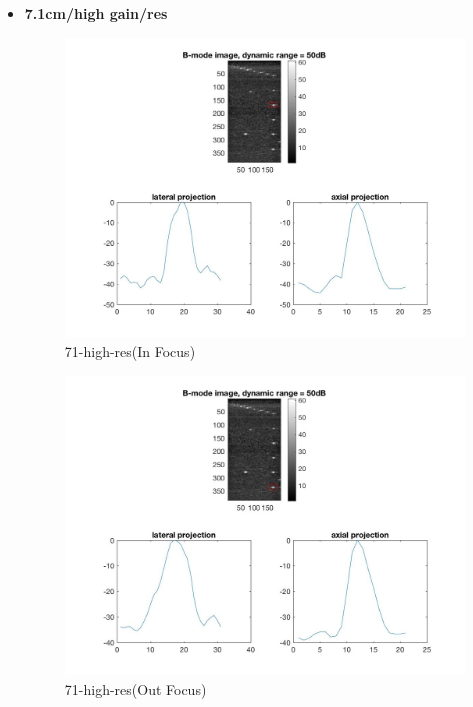 \documentclass[12pts,a4paper]{article}
\begin{document}
\begin{itemize}
\pagebreak
\item{\textbf{7.1cm/high gain/res}}
\begin{center}
\end{center}
\begin{figure}[h]
    \centering
    \includegraphics[width=1.0\textwidth]{img_hw1/71-high-res1.jpg}
    \caption{71-high-res(In Focus)}
    \label{fig:mesh1}
\end{figure}
\pagebreak
\begin{figure}[h]
    \centering
    \includegraphics[width=1.0\textwidth]{img_hw1/71-high-res2.jpg}
    \caption{71-high-res(Out Focus)}
    \label{fig:mesh1}
\end{figure}

\end{itemize}
\end{document}
